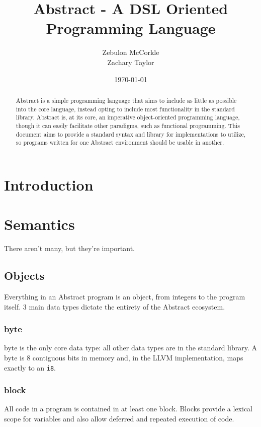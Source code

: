 \documentclass[letterpaper,titlepage]{scrreprt}
\title{Abstract - A DSL Oriented Programming Language}
\subtitle{\textipa{[\ae{}b 'str\ae{}kt]}}
\author{Zebulon McCorkle\\[1ex] 
\small Zachary Taylor}
\date{\today}
\begin{document}
\maketitle

\begin{abstract}
Abstract is a simple programming language that aims to include as little as possible into the core language, instead opting to include most functionality in the standard library. Abstract is, at its core, an imperative object-oriented programming language, though it can easily facilitate other paradigms, such as functional programming. This document aims to provide a standard syntax and library for implementations to utilize, so programs written for one Abstract environment should be usable in another.
\end{abstract}

\chapter{Introduction}
\label{ch:Introduction}

\chapter{Semantics}
\label{ch:Semantics}

There aren't many, but they're important.

\section{Objects}
\label{ch:Objects}

Everything in an Abstract program is an object, from integers to the program itself. 3 main data types dictate the entirety of the Abstract ecosystem.

\subsection{byte}
\label{subsec:byte}

byte is the only core data type: all other data types are in the standard library. A byte is 8 contiguous bits in memory and, in the LLVM implementation, maps exactly to an \lstinline{i8}.

\subsection{block}
\label{subsec:block}

All code in a program is contained in at least one block. Blocks provide a lexical scope for variables and also allow deferred and repeated execution of code.
\end{document}
